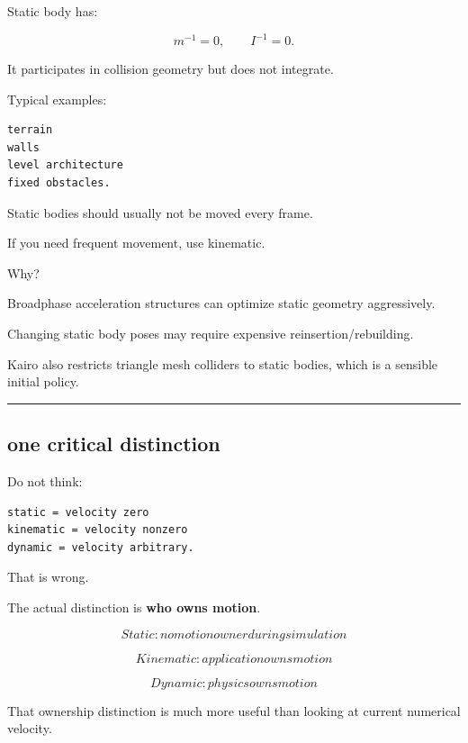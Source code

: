 \hypertarget{06-engine-ii-ch037-part-1661-static-body-semantics}{}

Static body has:

\[
m^{-1}=0,
\qquad
I^{-1}=0.
\]

It participates in collision geometry but does not integrate.

Typical examples:

\begin{verbatim}
terrain
walls
level architecture
fixed obstacles.
\end{verbatim}

Static bodies should usually not be moved every frame.

If you need frequent movement, use kinematic.

Why?

Broadphase acceleration structures can optimize static geometry aggressively.

Changing static body poses may require expensive reinsertion/rebuilding.

Kairo also restricts triangle mesh colliders to static bodies, which is a sensible initial policy.

\begin{center}\rule{0.5\linewidth}{0.5pt}\end{center}

\subsection{one critical distinction}\label{06-engine-ii-ch037-one-critical-distinction}

\hypertarget{06-engine-ii-ch037-one-critical-distinction}{}

Do not think:

\begin{verbatim}
static = velocity zero
kinematic = velocity nonzero
dynamic = velocity arbitrary.
\end{verbatim}

That is wrong.

The actual distinction is \textbf{who owns motion}.

\[
\boxed{
Static:
no motion owner during simulation
}
\]

\[
\boxed{
Kinematic:
application owns motion
}
\]

\[
\boxed{
Dynamic:
physics owns motion
}
\]

That ownership distinction is much more useful than looking at current numerical velocity.

